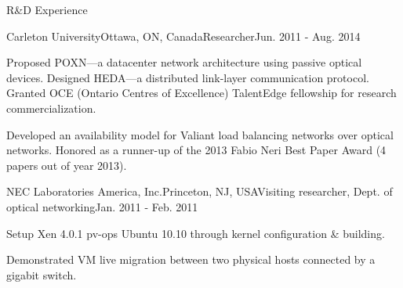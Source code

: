 \documentclass{resume} %
\begin{document}
\begin{rSection}{R\&D Experience}

\begin{rSubsection}{Carleton University}{Ottawa, ON, Canada}{Researcher}{Jun. 2011 - Aug. 2014}
\item Proposed POXN---a datacenter network architecture using passive optical devices. Designed HEDA---a distributed link-layer communication protocol. Granted OCE (Ontario Centres of Excellence) TalentEdge fellowship for research commercialization. %
\item Developed an availability model for Valiant load balancing networks over optical networks. Honored as a runner-up of the 2013 Fabio Neri Best Paper Award (4 papers out of year 2013).
\end{rSubsection}


\begin{rSubsection}{NEC Laboratories America, Inc.}{Princeton, NJ, USA}{Visiting researcher, Dept. of optical networking}{Jan. 2011 - Feb. 2011}
\item Setup Xen 4.0.1 pv-ops Ubuntu 10.10 through kernel configuration \& building. 
\item Demonstrated VM live migration between two physical hosts connected by a gigabit switch.
\end{rSubsection}

\end{rSection}



\end{document}

